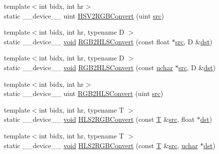 \begin{DoxyCompactItemize}
\item 
{\footnotesize template$<$int bidx, int hr$>$ }\\static \-\_\-\-\_\-device\-\_\-\-\_\- uint \hyperlink{namespacecv_1_1gpu_1_1device_1_1color__detail_a5a7756fb5353715748bbecaf940a134d}{H\-S\-V2\-R\-G\-B\-Convert} (uint \hyperlink{legacy_8hpp_a371cd109b74033bc4366f584edd3dacc}{src})
\item 
{\footnotesize template$<$int bidx, int hr, typename D $>$ }\\static \-\_\-\-\_\-device\-\_\-\-\_\- \hyperlink{legacy_8hpp_a8bb47f092d473522721002c86c13b94e}{void} \hyperlink{namespacecv_1_1gpu_1_1device_1_1color__detail_a43a6defd02744c62b4603d453daa4981}{R\-G\-B2\-H\-L\-S\-Convert} (const float $\ast$\hyperlink{legacy_8hpp_a371cd109b74033bc4366f584edd3dacc}{src}, D \&\hyperlink{photo__c_8h_aed13e2a25279b24dc954073233fef7a5}{dst})
\item 
{\footnotesize template$<$int bidx, int hr, typename D $>$ }\\static \-\_\-\-\_\-device\-\_\-\-\_\- \hyperlink{legacy_8hpp_a8bb47f092d473522721002c86c13b94e}{void} \hyperlink{namespacecv_1_1gpu_1_1device_1_1color__detail_afd0e640ef71097d01b9f2938477ff770}{R\-G\-B2\-H\-L\-S\-Convert} (const \hyperlink{core_2types__c_8h_a65f85814a8290f9797005d3b28e7e5fc}{uchar} $\ast$\hyperlink{legacy_8hpp_a371cd109b74033bc4366f584edd3dacc}{src}, D \&\hyperlink{photo__c_8h_aed13e2a25279b24dc954073233fef7a5}{dst})
\item 
{\footnotesize template$<$int bidx, int hr$>$ }\\static \-\_\-\-\_\-device\-\_\-\-\_\- uint \hyperlink{namespacecv_1_1gpu_1_1device_1_1color__detail_a4014ac4187dbe5b473f82868925f4c6d}{R\-G\-B2\-H\-L\-S\-Convert} (uint \hyperlink{legacy_8hpp_a371cd109b74033bc4366f584edd3dacc}{src})
\item 
{\footnotesize template$<$int bidx, int hr, typename T $>$ }\\static \-\_\-\-\_\-device\-\_\-\-\_\- \hyperlink{legacy_8hpp_a8bb47f092d473522721002c86c13b94e}{void} \hyperlink{namespacecv_1_1gpu_1_1device_1_1color__detail_a4a1ff5130ced9608e0385480aa9f3a71}{H\-L\-S2\-R\-G\-B\-Convert} (const \hyperlink{calib3d_8hpp_a3efb9551a871ddd0463079a808916717}{T} \&\hyperlink{legacy_8hpp_a371cd109b74033bc4366f584edd3dacc}{src}, float $\ast$\hyperlink{photo__c_8h_aed13e2a25279b24dc954073233fef7a5}{dst})
\item 
{\footnotesize template$<$int bidx, int hr, typename T $>$ }\\static \-\_\-\-\_\-device\-\_\-\-\_\- \hyperlink{legacy_8hpp_a8bb47f092d473522721002c86c13b94e}{void} \hyperlink{namespacecv_1_1gpu_1_1device_1_1color__detail_a81114f62d71ca69c83bcf7bc5cbd7c13}{H\-L\-S2\-R\-G\-B\-Convert} (const \hyperlink{calib3d_8hpp_a3efb9551a871ddd0463079a808916717}{T} \&\hyperlink{legacy_8hpp_a371cd109b74033bc4366f584edd3dacc}{src}, \hyperlink{core_2types__c_8h_a65f85814a8290f9797005d3b28e7e5fc}{uchar} $\ast$\hyperlink{photo__c_8h_aed13e2a25279b24dc954073233fef7a5}{dst})

\end{DoxyCompactItemize}
